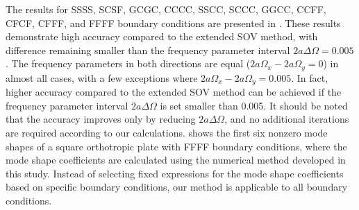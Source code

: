 \documentclass[preprint,12pt]{elsarticle}
\begin{document}
The results for SSSS, SCSF, GCGC, CCCC, SSCC, SCCC, GGCC, CCFF, CFCF, CFFF, and FFFF boundary conditions are presented in . 
These results demonstrate high accuracy compared to the extended SOV method, with difference remaining smaller than the frequency parameter interval $2a\Delta\Omega=0.005$. 
The frequency parameters in both directions are equal (\(2a\Omega_x - 2a\Omega_y = 0\)) in almost all cases, with a few exceptions where \(2a\Omega_x - 2a\Omega_y = 0.005\). 
In fact, higher accuracy compared to the extended SOV method can be achieved if the frequency parameter interval \(2a\Delta\Omega\) is set smaller than 0.005. It should be noted that the accuracy improves only by reducing \(2a\Delta\Omega\), and no additional iterations are required according to our calculations.
 shows the first six nonzero mode shapes of a square orthotropic plate with FFFF boundary conditions, where the mode shape coefficients are calculated using the numerical method developed in this study. 
Instead of selecting fixed expressions for the mode shape coefficients based on specific boundary conditions, our method is applicable to all boundary conditions.
\end{document}
